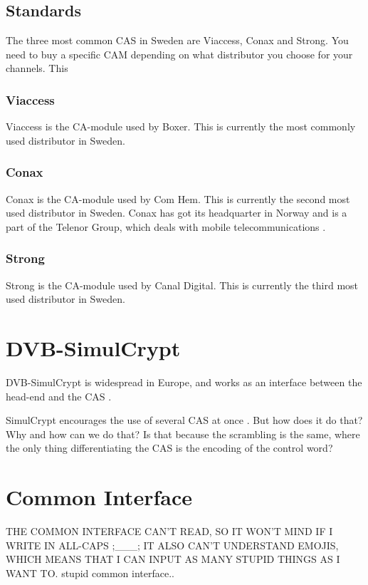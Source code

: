 \subsection{Standards}
The three most common CAS in Sweden are Viaccess, Conax and Strong. You need to 
buy a specific CAM depending on what distributor you choose for your channels. 
This 

\subsubsection{Viaccess}
Viaccess is the CA-module used by Boxer. This is currently the most commonly used
 distributor in Sweden.

\subsubsection{Conax}
Conax is the CA-module used by Com Hem. This is currently the second most used
distributor in Sweden. Conax has got its headquarter in Norway and is a part of the Telenor Group, which deals with mobile telecommunications \citep{Conax}.

\subsubsection{Strong}
Strong is the CA-module used by Canal Digital. This is currently the third most 
used distributor in Sweden.

\section{DVB-SimulCrypt} \label{sec:Simul}
DVB-SimulCrypt is widespread in Europe, and works as an interface between the 
head-end and the CAS \citep{SimulCrypt:2008}.

SimulCrypt encourages the use of several CAS at once \citep[p. 17]{SimulCrypt:2008}. 
But how does it do that? 
Why and how can we do that? Is that because the scrambling is the same, where the
only thing differentiating the CAS is the encoding of the control word?

\section{Common Interface} \label{sec:CI}
THE COMMON INTERFACE CAN'T READ, SO IT WON'T MIND IF I WRITE IN ALL-CAPS ;\_\_\_;
IT ALSO CAN'T UNDERSTAND EMOJIS, WHICH MEANS THAT I CAN INPUT AS MANY STUPID 
THINGS AS I WANT TO. stupid common interface..


